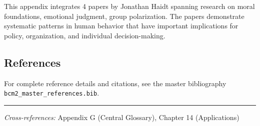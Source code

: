 This appendix integrates 4 papers by Jonathan Haidt
spanning research on moral foundations, emotional judgment, group polarization.
The papers demonstrate systematic patterns in human behavior that have important
implications for policy, organization, and individual decision-making.

\subsection{References}

For complete reference details and citations, see the master bibliography
\texttt{bcm2\_master\_references.bib}.

\vspace{1em}
\hrule
\vspace{0.5em}

\noindent\textit{Cross-references:}
Appendix G (Central Glossary), Chapter 14 (Applications)
